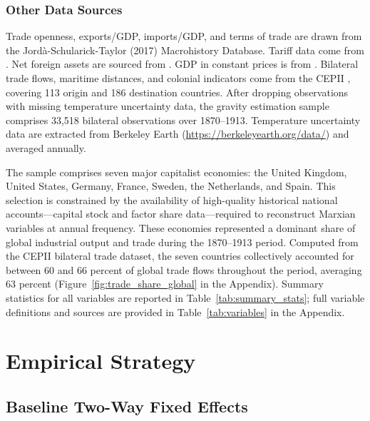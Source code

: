 \documentclass[10pt]{article}
\begin{document}
\subsubsection{Other Data Sources}
Trade openness, exports/GDP, imports/GDP, and terms of trade are drawn from the Jord\`{a}-Schularick-Taylor (2017) Macrohistory Database. Tariff data come from \citet{ClemensWilliamson2004}. Net foreign assets are sourced from \citet{PikettyZucman2014}. GDP in constant prices is from \citet{Maddison2010}. Bilateral trade flows, maritime distances, and colonial indicators come from the CEPII \citep{CEPII:2016-13}, covering 113 origin and 186 destination countries. After dropping observations with missing temperature uncertainty data, the gravity estimation sample comprises 33,518 bilateral observations over 1870--1913. Temperature uncertainty data are extracted from Berkeley Earth (\url{https://berkeleyearth.org/data/}) and averaged annually.

\par The sample comprises seven major capitalist economies: the United Kingdom, United States, Germany, France, Sweden, the Netherlands, and Spain. This selection is constrained by the availability of high-quality historical national accounts---capital stock and factor share data---required to reconstruct Marxian variables at annual frequency. These economies represented a dominant share of global industrial output and trade during the 1870--1913 period. Computed from the CEPII bilateral trade dataset, the seven countries collectively accounted for between 60 and 66 percent of global trade flows throughout the period, averaging 63 percent (Figure~\ref{fig:trade_share_global} in the Appendix). Summary statistics for all variables are reported in Table~\ref{tab:summary_stats}; full variable definitions and sources are provided in Table~\ref{tab:variables} in the Appendix.



\section{Empirical Strategy}
\label{sec:empirical}

\subsection{Baseline Two-Way Fixed Effects}
\label{subsec:twfe}
\end{document}
